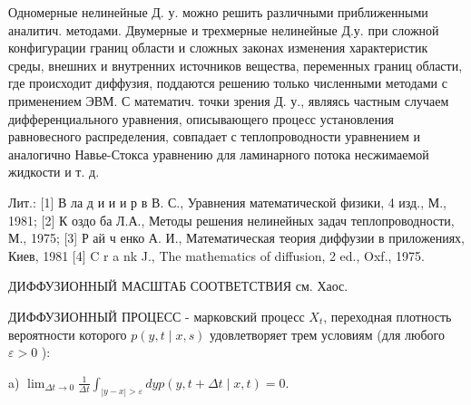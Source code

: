 \documentclass[10pt]{article}
\begin{document}
Одномерные нелинейные Д. у. можно решить различными приближенными аналитич. методами. Двумерные и трехмерные нелинейные Д.у. при сложной конфигурации границ области и сложных законах изменения характеристик среды, внешних и внутренних источников вещества, переменных границ области, где происходит диффузия, поддаются решению только численными методами с применением ЭВМ. С математич. точки зрения Д. у., являясь частным случаем дифференциального уравнения, описывающего процесс установления равновесного распределения, совпадает с теплопроводности уравнением и аналогично Навье-Стокса уравнению для ламинарного потока несжимаемой жидкости и т. д.



Лит.: [1] В ла д и и и р в В. С., Уравнения математической физики, 4 изд., М., 1981; [2] К оздо ба Л.А., Методы решения нелинейных задач теплопроводности, М., 1975; [3] Р ай ч енко А. И., Математическая теория диффузии в приложениях, Киев, 1981 [4] C r a nk J., The mathematics of diffusion, 2 ed., Oxf., 1975.



ДИФФУЗИОННЫЙ МАСШТАБ СООТВЕТСТВИЯ см. Хаос.



ДИФФУЗИОННЫЙ ПРОЦЕСС - марковский процесс $X_{t}$, переходная плотность вероятности которого $p(y, t \mid x, s)$ удовлетворяет трем условиям (для любого $\varepsilon>0$ ):



a) $\lim _{\Delta t \rightarrow 0} \frac{1}{\Delta t} \int_{|y-x|>\varepsilon} d y p(y, t+\Delta t \mid x, t)=0$.
\end{document}
